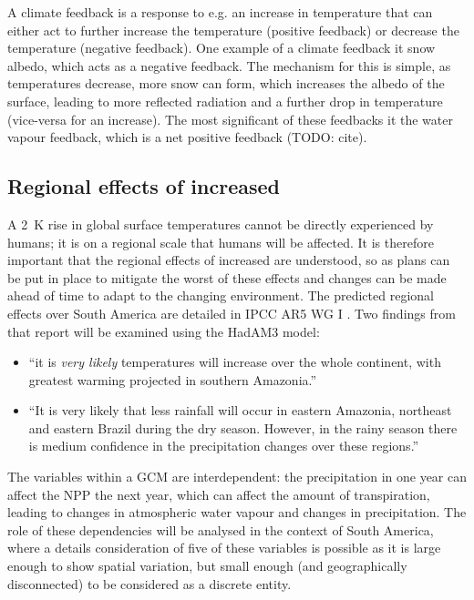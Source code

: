 \documentclass{article}
\begin{document}
A climate feedback is a response to e.g. an increase in temperature that can either act to further increase the temperature (positive feedback) or decrease the temperature (negative feedback). One example of a climate feedback it snow albedo, which acts as a negative feedback. The mechanism for this is simple, as temperatures decrease, more snow can form, which increases the albedo of the surface, leading to more reflected radiation and a further drop in temperature (vice-versa for an increase). The most significant of these feedbacks it the water vapour feedback, which is a net positive feedback (TODO: cite).

\subsection{Regional effects of increased }
A \SI{2}{K} rise in global surface temperatures cannot be directly experienced by humans; it is on a regional scale that humans will be affected. It is therefore important that the regional effects of increased  are understood, so as plans can be put in place to mitigate the worst of these effects and changes can be made ahead of time to adapt to the changing environment. The predicted regional effects over South America are detailed in IPCC AR5 WG I \parencite{ipcc2014wg1}. Two findings from that report will be examined using the HadAM3 model:
\begin{itemize}
    \item ``it is \textit{very likely} temperatures will increase over the whole continent, with greatest warming projected in southern Amazonia.''
    \item ``It is very likely that less rainfall will occur in eastern Amazonia, northeast and eastern Brazil during the dry season. However, in the rainy season there is medium confidence in the precipitation changes over these regions.''
\end{itemize}

The variables within a GCM are interdependent: the precipitation in one year can affect the NPP the next year, which can affect the amount of transpiration, leading to changes in atmospheric water vapour and changes in precipitation. The role of these dependencies will be analysed in the context of South America, where a details consideration of five of these variables is possible as it is large enough to show spatial variation, but small enough (and geographically disconnected) to be considered as a discrete entity.
\end{document}
